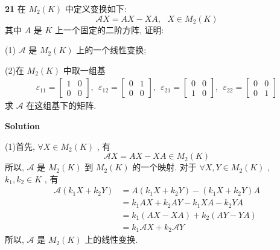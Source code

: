 \documentclass[11pt,a4paper,openany,oneside]{book}
\newcommand\Solution{\noindent\textbf{\textsf{Solution}}\par\medskip}
\begin{document}
\begin{myexample}
\textbf{21} 在 $ M_2(K) $ 中定义变换如下:
 $$  \mathcal{A}X = AX -XA, \ \ \ X \in M_2(K)  $$ 
其中 $ A $ 是 $ K $ 上一个固定的二阶方阵, 证明:

(1) $ \mathcal{A} $ 是 $ M_2(K) $ 上的一个线性变换;

(2)在 $ M_2(K) $ 中取一组基
\begin{gather*}
\varepsilon_{11} = 
\begin{bmatrix}
1 & 0 \\
0 & 0
\end{bmatrix}, \ \ 
\varepsilon_{12}=
\begin{bmatrix}
0 & 1 \\
0 & 0
\end{bmatrix}, \ \ 
\varepsilon_{21}=
\begin{bmatrix}
0 & 0 \\
1 & 0
\end{bmatrix}, \ \ 
\varepsilon_{22}=
\begin{bmatrix}
0 & 0 \\
0 & 1
\end{bmatrix}
\end{gather*}
求 $ \mathcal{A} $ 在这组基下的矩阵. 
\end{myexample}
\Solution

(1)首先,  $ \forall X \in M_2(K) $ , 有
 $$  \mathcal{A}X = AX - XA \in M_2(K)  $$ 
所以,  $ \mathcal{A} $ 是 $ M_2(K) $ 到 $ M_2(K) $ 的一个映射. 对于 $ \forall X, Y \in M_2(K) $ ,  $ k_1, k_2 \in K $ , 有
\begin{align*}
\mathcal{A}(k_1X + k_2Y) &= A(k_1X+k_2Y) - (k_1X+k_2Y)A  \\
&= k_1AX+k_2AY - k_1XA-k_2YA  \\
&=k_1(AX-XA) + k_2(AY-YA)  \\ 
&=k_1\mathcal{A}X + k_2\mathcal{A}Y 
\end{align*}
所以,  $ \mathcal{A} $ 是 $ M_2(K) $ 上的线性变换. \\
\end{document}
